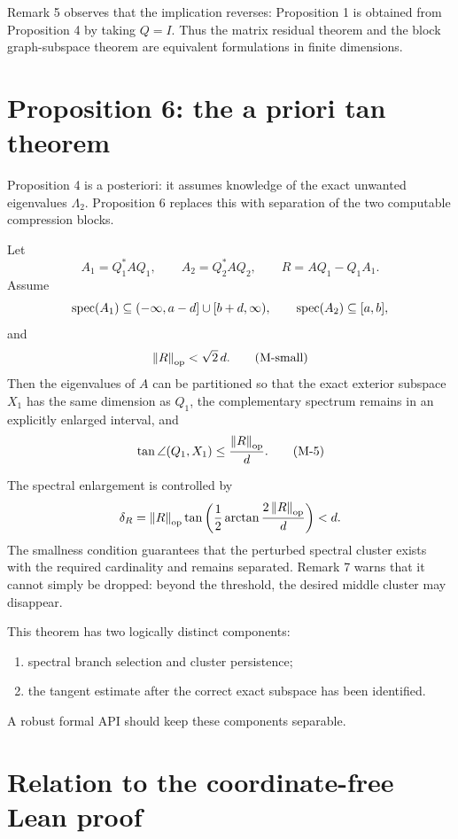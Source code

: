 Remark 5 observes that the implication reverses: Proposition 1 is obtained from Proposition 4 by taking $Q=I$. Thus the matrix residual theorem and the block graph-subspace theorem are equivalent formulations in finite dimensions.

\section{Proposition 6: the a priori tan theorem}


Proposition 4 is a posteriori: it assumes knowledge of the exact unwanted eigenvalues $\Lambda_2$. Proposition 6 replaces this with separation of the two computable compression blocks.

Let
\[
  A_1=Q_1^*AQ_1,
  \qquad
  A_2=Q_2^*AQ_2,
  \qquad
  R=AQ_1-Q_1A_1.
\]
Assume
\[
  \operatorname{spec}(A_1)
  \subseteq(-\infty,a-d]\cup[b+d,\infty),
  \qquad
  \operatorname{spec}(A_2)\subseteq[a,b],
\]
and
\begin{equation}
  \left\lVert R\right\rVert_{\mathrm{op}}<\sqrt2\,d.
  \tag{M-small}
\end{equation}
Then the eigenvalues of $A$ can be partitioned so that the exact exterior subspace $X_1$ has the same dimension as $Q_1$, the complementary spectrum remains in an explicitly enlarged interval, and
\begin{equation}
  \tan\angle(Q_1,X_1)
  \le\frac{\left\lVert R\right\rVert_{\mathrm{op}}}{d}.
  \tag{M-5}
\end{equation}

The spectral enlargement is controlled by
\[
  \delta_R
  =\left\lVert R\right\rVert_{\mathrm{op}}
    \tan\left(
      \frac12\arctan\frac{2\left\lVert R\right\rVert_{\mathrm{op}}}{d}
    \right)
  <d.
\]
The smallness condition guarantees that the perturbed spectral cluster exists with the required cardinality and remains separated. Remark 7 warns that it cannot simply be dropped: beyond the threshold, the desired middle cluster may disappear.

This theorem has two logically distinct components:
\begin{enumerate}[leftmargin=2em]
\item spectral branch selection and cluster persistence;
\item the tangent estimate after the correct exact subspace has been identified.
\end{enumerate}
A robust formal API should keep these components separable.

\section{Relation to the coordinate-free Lean proof}

